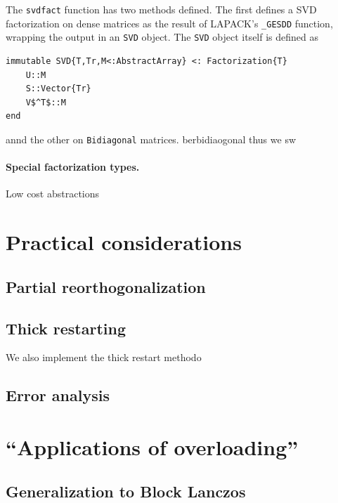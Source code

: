 \documentclass[final,leqno]{siamltex1213}
\begin{document}
The \verb|svdfact| function has two methods defined. The first defines a SVD
factorization on dense matrices as the result of LAPACK's \verb|_GESDD|
function, wrapping the output in an \verb|SVD| object. The \verb|SVD| object itself is defined as

\begin{lstlisting}
immutable SVD{T,Tr,M<:AbstractArray} <: Factorization{T}
    U::M
    S::Vector{Tr}
    V$^T$::M
end
\end{lstlisting}


annd the other on \verb|Bidiagonal| matrices. berbidiaogonal thus we
sw



\paragraph{Special factorization types.}
Low cost abstractions


\section{Practical considerations}


\subsection{Partial reorthogonalization}



\subsection{Thick restarting}

We also implement the thick restart methodo


\subsection{Error analysis}



\section{``Applications of overloading''}

\subsection{Generalization to Block Lanczos}
\end{document}
